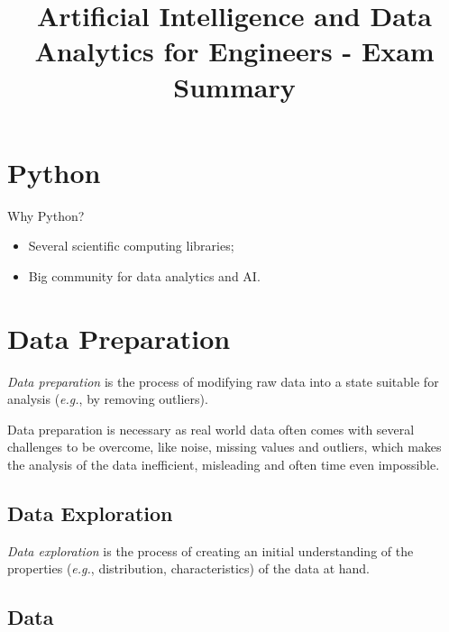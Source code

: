 \documentclass[a4paper]{report}
\title{Artificial Intelligence and Data Analytics for Engineers - Exam Summary}
\begin{document}
\maketitle

\section*{Python}

Why Python?

\begin{itemize}
    \item Several scientific computing libraries;
    \item Big community for data analytics and AI.
\end{itemize}

\section*{Data Preparation}

\begin{definition}
    \emph{Data preparation} is the process of modifying raw data into a state suitable for analysis (\emph{e.g.}, by removing outliers).
\end{definition}

Data preparation is necessary as real world data often comes with several challenges to be overcome, like noise, missing values and outliers, which makes the analysis of the data inefficient, misleading and often time even impossible.

\subsection*{Data Exploration}

\begin{definition}
    \emph{Data exploration} is the process of creating an initial understanding of the properties (\emph{e.g.}, distribution, characteristics) of the data at hand.
\end{definition}

\subsection*{Data}
\end{document}

